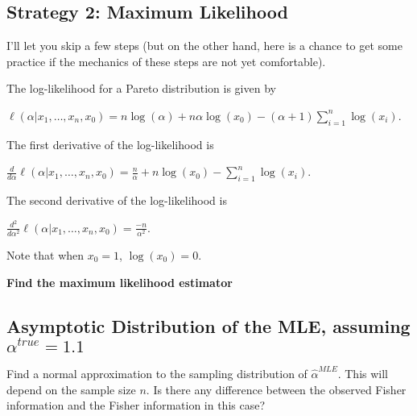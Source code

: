 \documentclass[]{article}
\begin{document}
\newpage

\subsection{Strategy 2: Maximum
Likelihood}\label{strategy-2-maximum-likelihood}

I'll let you skip a few steps (but on the other hand, here is a chance
to get some practice if the mechanics of these steps are not yet
comfortable).

The log-likelihood for a Pareto distribution is given by

\(\ell(\alpha | x_1, \ldots, x_n, x_0) = n \log(\alpha) + n \alpha \log(x_0) - (\alpha + 1) \sum_{i = 1}^n \log(x_i)\).

The first derivative of the log-likelihood is

\(\frac{d}{d\alpha} \ell(\alpha | x_1, \ldots, x_n, x_0) = \frac{n}{\alpha} + n \log(x_0) - \sum_{i = 1}^n \log(x_i)\).

The second derivative of the log-likelihood is

\(\frac{d^2}{d\alpha^2} \ell(\alpha | x_1, \ldots, x_n, x_0) = \frac{-n}{\alpha^2}\).

Note that when \(x_0 = 1\), \(\log(x_0) = 0\).

\textbf{Find the maximum likelihood estimator}

\vspace{6cm}

\subsection{\texorpdfstring{Asymptotic Distribution of the MLE, assuming
\(\alpha^{true} = 1.1\)}{Asymptotic Distribution of the MLE, assuming \textbackslash{}alpha\^{}\{true\} = 1.1}}\label{asymptotic-distribution-of-the-mle-assuming-alphatrue-1.1}

Find a normal approximation to the sampling distribution of
\(\hat{\alpha}^{MLE}\). This will depend on the sample size \(n\). Is
there any difference between the observed Fisher information and the
Fisher information in this case?
\end{document}
